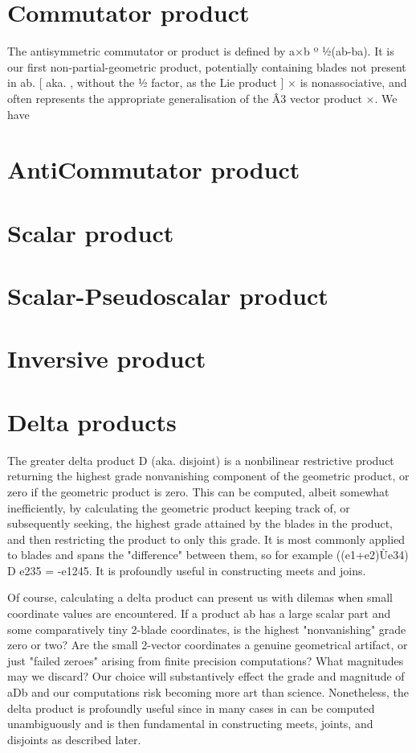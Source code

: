 \documentclass[a4paper]{book}
\numberwithin{equation}{chapter}
\begin{document}
    \section{Commutator product}

The antisymmetric commutator or product is defined by a×b º ½(ab-ba). It is our first non-partial-geometric product, potentially containing blades not present in ab. [  aka. , without the ½ factor, as the Lie product ]
    × is nonassociative, and often represents the appropriate generalisation of the Â3 vector product ×.
    We have 

    \section{AntiCommutator product}
    \section{Scalar product}
    \section{Scalar-Pseudoscalar product}
    \section{Inversive product}
    \section{Delta products}

The greater delta product D (aka. disjoint) is a nonbilinear restrictive product returning the highest grade nonvanishing component of the geometric product, or zero if the geometric product is zero. This can be computed, albeit somewhat inefficiently, by calculating the geometric product keeping track of, or subsequently seeking, the highest grade attained by the blades in the product, and then restricting the product to only this grade. It is most commonly applied to blades and spans the "difference" between them, so for example ((e1+e2)Ùe34) D e235 = -e1245.   It is profoundly useful in constructing meets and joins.

Of course, calculating a delta product can present us with dilemas when small coordinate values are encountered. If a product ab has a large scalar part and some comparatively tiny 2-blade coordinates, is the highest "nonvanishing" grade zero or two? Are the small 2-vector coordinates a genuine geometrical artifact, or just "failed zeroes" arising from finite precision computations? What magnitudes may we discard? Our choice will substantively effect the grade and magnitude of aDb and our computations risk becoming more art than science. Nonetheless, the delta product is profoundly useful since in many cases in can be computed unambiguously and is then fundamental in constructing meets,  joints, and disjoints as described later.
\end{document}
